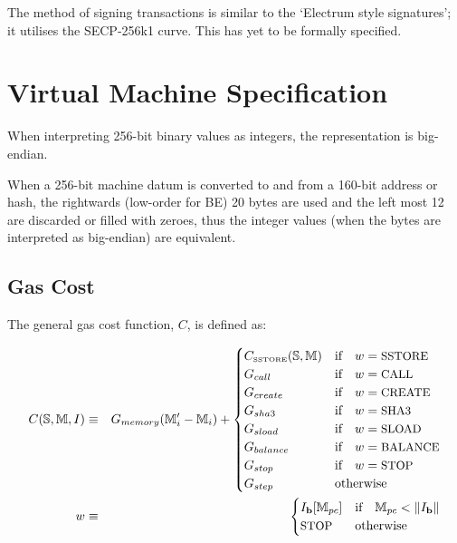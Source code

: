 \documentclass[9pt,oneside]{amsart}
\begin{document}
The method of signing transactions is similar to the `Electrum style signatures'; it utilises the SECP-256k1 curve. This has yet to be formally specified.

\section{Virtual Machine Specification}\label{app:vm}

When interpreting 256-bit binary values as integers, the representation is big-endian.

When a 256-bit machine datum is converted to and from a 160-bit address or hash, the rightwards (low-order for BE) 20 bytes are used and the left most 12 are discarded or filled with zeroes, thus the integer values (when the bytes are interpreted as big-endian) are equivalent.

\subsection{Gas Cost}

The general gas cost function, $C$, is defined as:

\begin{eqnarray}
C(\mathbb{S}, \mathbb{M}, I) & \equiv & G_{memory}(\mathbb{M}'_i - \mathbb{M}_i) + \begin{cases}
C_\text{\tiny SSTORE}(\mathbb{S}, \mathbb{M}) & \text{if} \quad w = \text{\small SSTORE} \\
G_{call} & \text{if} \quad w = \text{\small CALL}\\
G_{create} & \text{if} \quad w = \text{\small CREATE}\\
G_{sha3} & \text{if} \quad w = \text{\small SHA3}\\
G_{sload} & \text{if} \quad w = \text{\small SLOAD}\\
G_{balance} & \text{if} \quad w = \text{\small BALANCE}\\
G_{stop} & \text{if} \quad w = \text{\small STOP}\\
G_{step} & \text{otherwise}
\end{cases} \\
w & \equiv & \begin{cases} I_\mathbf{b}[\mathbb{M}_{pc}] & \text{if} \quad \mathbb{M}_{pc} < \lVert I_\mathbf{b} \rVert \\
\text{\small STOP} & \text{otherwise}
\end{cases}
\end{eqnarray}
\end{document}

